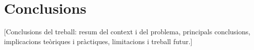
\chapter{Conclusions}

[Conclusions del treball: resum del context i del problema, principals conclusions, implicacions teòriques i pràctiques, limitacions i treball futur.]
